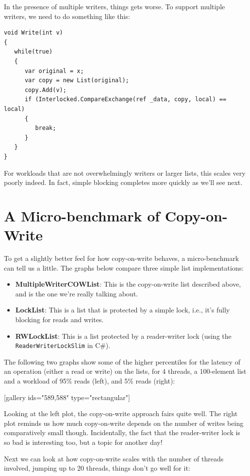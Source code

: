 \documentclass[11pt]{article}
\begin{document}
In the presence of multiple writers, things gets worse. To support multiple writers, we need to do something like this:

\begin{lstlisting}
void Write(int v)
{
   while(true)
   {
      var original = x;
      var copy = new List(original);
      copy.Add(v);
      if (Interlocked.CompareExchange(ref _data, copy, local) == local)
      {
         break;
      }
   }
}
\end{lstlisting}

For workloads that are not overwhelmingly writers or larger lists, this scales very poorly indeed. In fact, simple blocking completes more quickly as we'll see next. 

\section{A Micro-benchmark of Copy-on-Write}

 

To get a slightly better feel for how copy-on-write behaves, a micro-benchmark can tell us a little. The graphs below compare three simple list implementations: 
\begin{itemize}
\item \textbf{MultipleWriterCOWList}: This is the copy-on-write list described above, and is the one we're really talking about.
\item \textbf{LockList}: This is a list that is protected by a simple lock, i.e., it's fully blocking for reads and writes.
\item \textbf{RWLockList}: This is a list protected by a reader-writer lock (using the \texttt{ReaderWriterLockSlim} in C\#).
\end{itemize}

The following two graphs show some of the higher percentiles for the latency of an operation (either a read or write) on the lists, for 4 threads, a 100-element list and a workload of 95\% reads (left), and 5\% reads (right):

[gallery ids="589,588" type="rectangular"]

Looking at the left plot, the copy-on-write approach fairs quite well. The right plot reminds us how much copy-on-write depends on the number of writes being comparatively small though. Incidentally, the fact that the reader-writer lock is so bad is interesting too, but a topic for another day!

Next we can look at how copy-on-write scales with the number of threads involved, jumping up to 20 threads, things don't go well for it:
\end{document}
